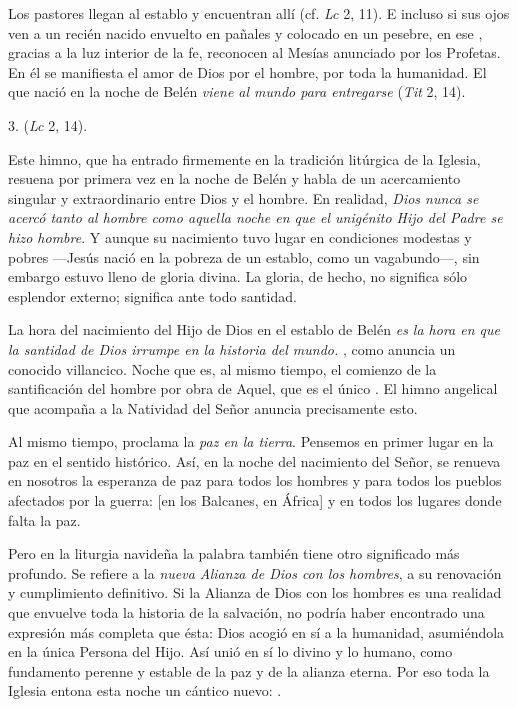 \begin{body}
	Los pastores llegan al establo y encuentran allí  (cf. \emph{Lc} 2, 11). E incluso si sus ojos ven a un recién nacido envuelto en pañales y colocado en un pesebre, en ese , gracias a la luz interior de la fe, reconocen al Mesías anunciado por los Profetas. En él se manifiesta el amor de Dios por el hombre, por toda la humanidad. El que nació en la noche de Belén \emph{viene al mundo para entregarse}  (\emph{Tit} 2, 14).
	
	3.  (\emph{Lc} 2, 14).
	
	Este himno, que ha entrado firmemente en la tradición litúrgica de la Iglesia, resuena por primera vez en la noche de Belén y habla de un acercamiento singular y extraordinario entre Dios y el hombre. En realidad, \emph{Dios nunca se acercó tanto al hombre como aquella noche en que el unigénito Hijo del Padre se hizo hombre}. Y aunque su nacimiento tuvo lugar en condiciones modestas y pobres ---Jesús nació en la pobreza de un establo, como un vagabundo---, sin embargo estuvo lleno de gloria divina. La gloria, de hecho, no significa sólo esplendor externo; significa ante todo santidad.
	
	La hora del nacimiento del Hijo de Dios en el establo de Belén \emph{es la hora en que la santidad de Dios irrumpe en la historia del mundo.} , como anuncia un conocido villancico. Noche que es, al mismo tiempo, el comienzo de la santificación del hombre por obra de Aquel, que es el único . El himno angelical que acompaña a la Natividad del Señor anuncia precisamente esto.
	
	Al mismo tiempo, proclama la \emph{paz en la tierra}. Pensemos en primer lugar en la paz en el sentido histórico. Así, en la noche del nacimiento del Señor, se renueva en nosotros la esperanza de paz para todos los hombres y para todos los pueblos afectados por la guerra: {[}en los Balcanes, en África{]} y en todos los lugares donde falta la paz.
	
	Pero en la liturgia navideña la palabra  también tiene otro significado más profundo. Se refiere a la \emph{nueva Alianza de Dios con los hombres}, a su renovación y cumplimiento definitivo. Si la Alianza de Dios con los hombres es una realidad que envuelve toda la historia de la salvación, no podría haber encontrado una expresión más completa que ésta: Dios acogió en sí a la humanidad, asumiéndola en la única Persona del Hijo. Así unió en sí lo divino y lo humano, como fundamento perenne y estable de la paz y de la alianza eterna. Por eso toda la Iglesia entona esta noche un cántico nuevo: .
\end{body}

